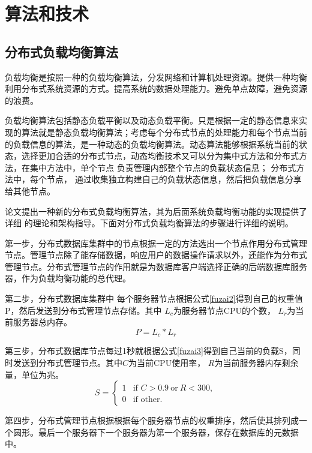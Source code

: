 \section{算法和技术}
\subsection{分布式负载均衡算法}
负载均衡是按照一种的负载均衡算法，分发网络和计算机处理资源。提供一种均衡利用分布式系统资源的方式。提高系统的数据处理能力。避免单点故障，避免资源的浪费。

负载均衡算法包括静态负载平衡以及动态负载平衡。只是根据一定的静态信息来实现的算法就是静态负载均衡算法；考虑每个分布式节点的处理能力和每个节点当前的负载信息的算法，是一种动态的负载均衡算法。动态算法能够根据系统当前的状态，选择更加合适的分布式节点，动态均衡技术又可以分为集中式方法和分布式方法，在集中方法中，单个节点
负责管理内部整个节点的负载状态信息；
分布式方法中，每个节点，
通过收集独立构建自己的负载状态信息，然后把负载信息分享给其他节点。

论文提出一种新的分布式负载均衡算法，其为后面系统负载均衡功能的实现提供了详细
的理论和架构指导。下面对分布式负载均衡算法的步骤进行详细的说明。

第一步，分布式数据库集群中的节点根据一定的方法选出一个节点作用分布式管理节点。管理节点除了能存储数据，响应用户的数据操作请求以外，还能作为分布式管理节点。分布式管理节点的作用就是为数据库客户端选择正确的后端数据库服务器，作为负载均衡功能的总代理。

第二步，分布式数据库集群中
每个服务器节点根据公式\ref{fuzai2}得到自己的权重值P，然后发送到分布式管理节点存储。其中
$ L_c $为服务器节点CPU的个数， $ L_r $为当前服务器总内存。
\begin{equation}
P=L_c * L_r \label{fuzai2}
\end{equation}

第三步，分布式数据库节点每过1秒就根据公式\ref{fuzai3}得到自己当前的负载S，同时发送到分布式管理节点。其中$ C $为当前CPU使用率， $ R $为当前服务器内存剩余量，单位为兆。
\begin{equation}
S =
\begin{cases}
1 & \text{if } C >0.9 \: \text{or} \: R<300,\\
0 & \text{if } \text{other}.
\end{cases}   \label{fuzai3}
\end{equation}

第四步，分布式管理节点根据根据每个服务器节点的权重排序，然后使其排列成一个圆形。最后一个服务器下一个服务器为第一个服务器，保存在数据库的元数据中。

